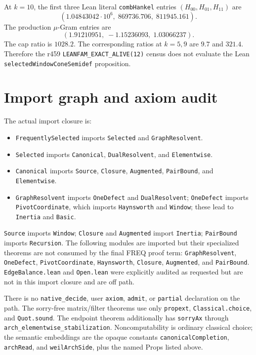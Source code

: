 \documentclass[10pt]{article}
\newcommand{\code}[1]{\nolinkurl{#1}}
\begin{document}
At $k=10$, the first three Lean literal \code{combHankel} entries
\((H_{00},H_{01},H_{11})\) are
\[
(1.04843042\cdot10^6,\;869736.706,\;811945.161).
\]
The production $\mu$-Gram entries are
\[
(1.91210951,\;-1.15236093,\;1.03066237).
\]
The cap ratio is $1028.2$.  The corresponding ratios at $k=5,9$ are
$9.7$ and $321.4$.  Therefore the r459
\code{LEANFAM_EXACT_ALIVE(12)} census does not evaluate the Lean
\code{selectedWindowConeSemidef} proposition.

\section{Import graph and axiom audit}

The actual import closure is:
\begin{itemize}
\item \code{FrequentlySelected} imports \code{Selected} and
\code{GraphResolvent}.
\item \code{Selected} imports \code{Canonical}, \code{DualResolvent},
and \code{Elementwise}.
\item \code{Canonical} imports \code{Source}, \code{Closure},
\code{Augmented}, \code{PairBound}, and \code{Elementwise}.
\item \code{GraphResolvent} imports \code{OneDefect} and
\code{DualResolvent}; \code{OneDefect} imports \code{PivotCoordinate},
which imports \code{Haynsworth} and \code{Window}; these lead to
\code{Inertia} and \code{Basic}.
\end{itemize}
\code{Source} imports \code{Window}; \code{Closure} and
\code{Augmented} import \code{Inertia}; \code{PairBound} imports
\code{Recursion}.  The following modules are imported but their
specialized theorems are not consumed by the final FREQ proof term:
\code{GraphResolvent}, \code{OneDefect}, \code{PivotCoordinate},
\code{Haynsworth}, \code{Closure}, \code{Augmented}, and
\code{PairBound}.
\code{EdgeBalance.lean} and \code{Open.lean} were explicitly audited
as requested but are not in this import closure and are off path.

There is no \code{native_decide}, user \code{axiom}, \code{admit}, or
\code{partial} declaration on the path.  The sorry-free matrix/filter
theorems use only \code{propext}, \code{Classical.choice}, and
\code{Quot.sound}.  The endpoint theorem additionally has
\code{sorryAx} through \code{arch_elementwise_stabilization}.
Noncomputability is ordinary classical choice; the semantic
embeddings are the opaque constants \code{canonicalCompletion},
\code{archRead}, and \code{weilArchSide}, plus the named Props listed
above.
\end{document}
